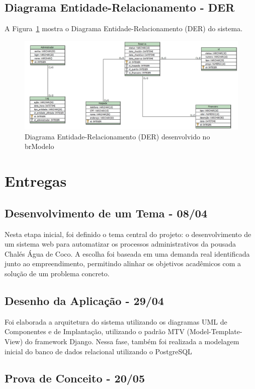 \documentclass[
	12pt,				%
	openany,			%
	twoside,			%
	a4paper,			%
	english,			%
	french,				%
	spanish,			%
	brazil				%
	]{abntex2}
\begin{document}
\subsection{Diagrama Entidade-Relacionamento - DER}
A Figura~\ref{fig:der} mostra o Diagrama Entidade-Relacionamento (DER) do sistema.

\begin{figure}[H]
	\centering
	\includegraphics[width=\textwidth]{0406-DER.jpg}
	\caption{Diagrama Entidade-Relacionamento (DER) desenvolvido no brModelo}
	\label{fig:der}
\end{figure}


\section{Entregas}

\subsection{Desenvolvimento de um Tema - 08/04}

Nesta etapa inicial, foi definido o tema central do projeto: o desenvolvimento de um sistema web para automatizar os processos administrativos da pousada Chalés Água de Coco. A escolha foi baseada em uma demanda real identificada junto ao empreendimento, permitindo alinhar os objetivos acadêmicos com a solução de um problema concreto.

\subsection{Desenho da Aplicação - 29/04}

Foi elaborada a arquitetura do sistema utilizando os diagramas UML de Componentes e de Implantação, utilizando o padrão MTV (Model-Template-View) do framework Django. Nessa fase, também foi realizada a modelagem inicial do banco de dados relacional utilizando o PostgreSQL

\subsection{Prova de Conceito - 20/05}
\end{document}
